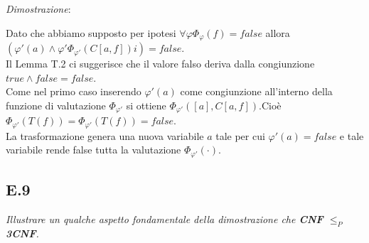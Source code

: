 \documentclass[a4paper]{article}
\newenvironment{dimostrazione}{\textit{Dimostrazione}:\begin{adjustwidth}{1cm}{}}{\end{adjustwidth}}
\begin{document}
\begin{dimostrazione}
\begin{itemize}
			Dato che abbiamo supposto per ipotesi $\forall \varphi \Phi_\varphi(f) = false$ allora $(\varphi'(a) \land \varphi' \Phi_{\varphi'}(C[a,f])i)=false$.\\
			Il Lemma T.2 ci suggerisce che il valore falso deriva dalla congiunzione $true \land false = false$.\\
			Come nel primo caso inserendo $\varphi'(a)$ come congiunzione all'interno della funzione di valutazione $\Phi_{\varphi'}$ si ottiene $\Phi_{\varphi'}([a],C[a,f])$.Cioè $\Phi_{\varphi'}(T(f)) = \Phi_{\varphi'}(T(f))=false$.\\
			La trasformazione genera una nuova variabile $a$ tale per cui $\varphi'(a) = false$ e tale variabile rende false tutta la valutazione $\Phi_{\varphi'}(\cdot)$.
	\end{itemize}
\end{dimostrazione}
\subsection{E.9}
\emph{Illustrare un qualche aspetto fondamentale della dimostrazione che \textbf{CNF} $\leq_P$ \textbf{3CNF}.}
\end{document}
